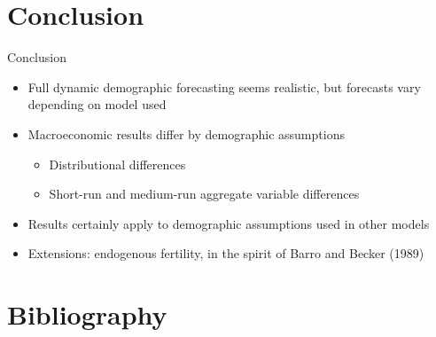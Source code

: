 \documentclass[12pt]{beamer}
\begin{document}
\section{Conclusion}

\begin{frame}{Conclusion}
	\begin{itemize}
		\item Full dynamic demographic forecasting seems realistic, but forecasts vary depending on model used
		\item Macroeconomic results differ by demographic assumptions
		\begin{itemize}
			\item Distributional differences
			\item Short-run and medium-run aggregate variable differences
		\end{itemize}
		\item Results certainly apply to demographic assumptions used in other models
		\item Extensions: endogenous fertility, in the spirit of Barro and Becker (1989)
	\end{itemize}
\end{frame}

\section{Bibliography}
\end{document}

